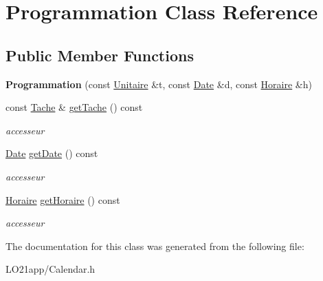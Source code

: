 \hypertarget{class_programmation}{}\section{Programmation Class Reference}
\label{class_programmation}
\subsection*{Public Member Functions}
\begin{DoxyCompactItemize}
\item 
\hypertarget{class_programmation_a2c557f9f87c56133c658e2b14cd68ab9}{}{\bfseries Programmation} (const \hyperlink{class_unitaire}{Unitaire} \&t, const \hyperlink{class_t_i_m_e_1_1_date}{Date} \&d, const \hyperlink{class_t_i_m_e_1_1_horaire}{Horaire} \&h)\label{class_programmation_a2c557f9f87c56133c658e2b14cd68ab9}

\item 
\hypertarget{class_programmation_a7395fca93b007fbd741e6a331b531ab9}{}const \hyperlink{class_tache}{Tache} \& \hyperlink{class_programmation_a7395fca93b007fbd741e6a331b531ab9}{get\+Tache} () const \label{class_programmation_a7395fca93b007fbd741e6a331b531ab9}

\begin{DoxyCompactList}\small\item\em accesseur \end{DoxyCompactList}\item 
\hypertarget{class_programmation_abab51a44ecfa15becd790571d80074e8}{}\hyperlink{class_t_i_m_e_1_1_date}{Date} \hyperlink{class_programmation_abab51a44ecfa15becd790571d80074e8}{get\+Date} () const \label{class_programmation_abab51a44ecfa15becd790571d80074e8}

\begin{DoxyCompactList}\small\item\em accesseur \end{DoxyCompactList}\item 
\hypertarget{class_programmation_af4b33fc2e67826566fff3ba43f637c4f}{}\hyperlink{class_t_i_m_e_1_1_horaire}{Horaire} \hyperlink{class_programmation_af4b33fc2e67826566fff3ba43f637c4f}{get\+Horaire} () const \label{class_programmation_af4b33fc2e67826566fff3ba43f637c4f}

\begin{DoxyCompactList}\small\item\em accesseur \end{DoxyCompactList}\end{DoxyCompactItemize}


The documentation for this class was generated from the following file\+:\begin{DoxyCompactItemize}
\item 
L\+O21app/Calendar.\+h\end{DoxyCompactItemize}
